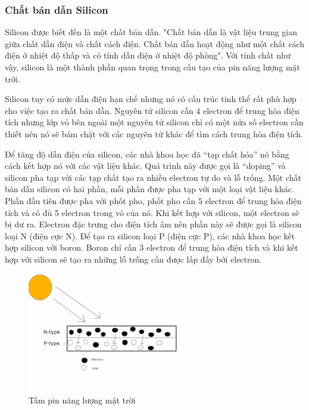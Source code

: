 \subsubsection*{Chất bán dẫn Silicon}
Silicon được biết đến là một chất bán dẫn. "Chất bán dẫn là vật liệu trung gian giữa chất dẫn điện và chất cách điện. Chất bán dẫn hoạt động như một chất cách điện ở nhiệt độ thấp và có tính dẫn điện ở nhiệt độ phòng". Với tính chất như vậy, silicon là một thành phần quan trọng trong cấu tạo của pin năng lượng mặt trời.

Silicon tuy có mức dẫn điện hạn chế nhưng nó có cấu trúc tinh thể rất phù hợp cho việc tạo ra chất bán dẫn. Nguyên tử silicon cần 4 electron để trung hòa điện tích nhưng lớp vỏ bên ngoài một nguyên tử silicon chỉ có một nửa số electron cần thiết nên nó sẽ bám chặt với các nguyên tử khác để tìm cách trung hòa điện tích.

Để tăng độ dẫn điện của silicon, các nhà khoa học đã “tạp chất hóa” nó bằng cách kết hợp nó với các vật liệu khác. Quá trình này được gọi là “doping” và silicon pha tạp với các tạp chất tạo ra nhiều electron tự do và lỗ trống. Một chất bán dẫn silicon có hai phần, mỗi phần được pha tạp với một loại vật liệu khác. Phần đầu tiên được pha với phốt pho, phốt pho cần 5 electron để trung hòa điện tích và có đủ 5 electron trong vỏ của nó. Khi kết hợp với silicon, một electron sẽ bị dư ra. Electron đặc trưng cho điện tích âm nên phần này sẽ được gọi là silicon loại N (điện cực N). Để tạo ra silicon loại P (điện cực P), các nhà khoa học kết hợp silicon với boron. Boron chỉ cần 3 electron để trung hòa điện tích và khi kết hợp với silicon sẽ tạo ra những lỗ trống cần được lấp đầy bởi electron.
\begin{figure}[H]
\centering    
\includegraphics[width=0.7\textwidth]{solarpanel_hinhthanhdientich}
\caption[Tấm pin năng lượng mặt trời]{Tấm pin năng lượng mặt trời}
\label{fig:solarpanel_hinhthanhdientich}
\end{figure}


